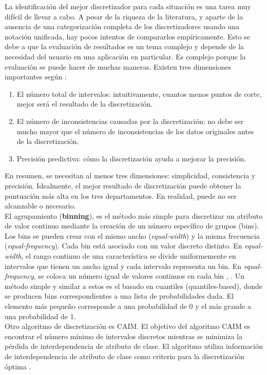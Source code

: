 La identificación del mejor discretizador para cada situación es una tarea muy difícil de llevar a cabo. A pesar de la riqueza de la literatura, y aparte de la ausencia de una categorización completa de los discretizadores usando una notación unificada, hay pocos intentos de compararlos empíricamente. Esto se debe a que la evaluación de resultados es un tema complejo y depende de la necesidad del usuario en una aplicación en particular. Es complejo porque la evaluación se puede hacer de muchas maneras. Existen tres dimensiones importantes según \citep{liu2002discretization}: 
\begin{enumerate}
	\item El número total de intervalos: intuitivamente, cuantos menos puntos de corte, mejor será el resultado de la discretización.
	\item El número de inconsistencias causadas por la discretización: no debe ser mucho mayor que el número de inconsistencias de los datos originales antes de la discretización.
	\item Precisión predictiva: cómo la discretización ayuda a mejorar la precisión.
\end{enumerate}
 En resumen, se necesitan al menos tres dimensiones: simplicidad, consistencia y precisión. Idealmente, el mejor resultado de discretización puede obtener la puntuación más alta en los tres departamentos. En realidad, puede no ser alcanzable o necesario. \\
 El agrupamiento (\textbf{binning}), es el método más simple para discretizar un atributo de valor continuo mediante la creación de un número específico de grupos (bins). Los bins se pueden crear con el mismo ancho (\textit{equal-width}) y la misma frecuencia (\textit{equal-frequency}). Cada bin está asociado con un valor discreto distinto. En \textit{equal-width}, el rango continuo de una característica se divide uniformemente en intervalos que tienen un ancho igual y cada intervalo representa un bin. En \textit{equal-frequency}, se coloca un número igual de valores continuos en cada bin \citep{liu2002discretization}, \citep{yang2009discretization}. Un método simple y similar a estos es el basado en cuantiles (quantiles-based), donde se producen bins correspondientes a una lista de probabilidades dada. El elemento más pequeño corresponde a una probabilidad de 0 y el más grande a una probabilidad de 1. \\
 Otro algoritmo de discretización es CAIM. El objetivo del algoritmo CAIM es encontrar el número mínimo de intervalos discretos mientras se minimiza la pérdida de interdependencia de atributo de clase. El algoritmo utiliza información de interdependencia de atributo de clase como criterio para la discretización óptima \citep{kurgan2004caim}.
 


